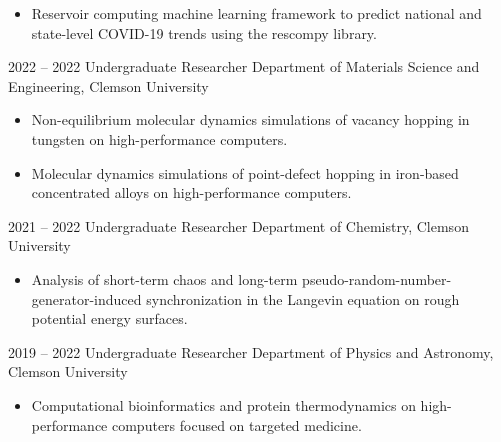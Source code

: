\documentclass[9pt]{developercv} %
\begin{document}
\begin{entrylist}
{\begin{itemize}[noitemsep,topsep=0pt,parsep=0pt,partopsep=0pt, leftmargin=-1pt]
            \item Reservoir computing machine learning framework to predict national and state-level COVID-19 trends using the rescompy library.
        \end{itemize} 
        }
    \entry
		{2022 -- 2022}
		{Undergraduate Researcher}
		{Department of Materials Science and Engineering, Clemson University}
		{\vspace{-10pt}
        \begin{itemize}[noitemsep,topsep=0pt,parsep=0pt,partopsep=0pt, leftmargin=-1pt]
            \item Non-equilibrium molecular dynamics simulations of vacancy hopping in tungsten on high-performance computers.
            \item Molecular dynamics simulations of point-defect hopping in iron-based concentrated alloys on high-performance computers.
        \end{itemize} 
        }
    \entry
		{2021 -- 2022}
		{Undergraduate Researcher}
		{Department of Chemistry, Clemson University}
		{\vspace{-10pt}
        \begin{itemize}[noitemsep,topsep=0pt,parsep=0pt,partopsep=0pt, leftmargin=-1pt]
            \item Analysis of short-term chaos and long-term pseudo-random-number-generator-induced synchronization in the Langevin equation on rough potential energy surfaces.
        \end{itemize} 
        }
    \entry
		{2019 -- 2022}
		{Undergraduate Researcher}
		{Department of Physics and Astronomy, Clemson University}
		{\vspace{-10pt}
        \begin{itemize}[noitemsep,topsep=0pt,parsep=0pt,partopsep=0pt, leftmargin=-1pt]
            \item Computational bioinformatics and protein thermodynamics on high-performance computers focused on targeted medicine.
        \end{itemize}
        }
\end{entrylist}

\vspace{-10 pt}
\renewcommand\refname{}
\vspace{-1.5cm}

\end{document}
